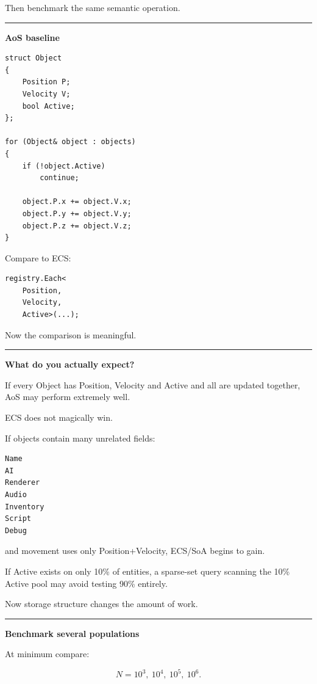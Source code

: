 Then benchmark the same semantic operation.

\begin{center}\rule{0.5\linewidth}{0.5pt}\end{center}

\textbf{AoS baseline}

\begin{verbatim}
struct Object
{
    Position P;
    Velocity V;
    bool Active;
};

for (Object& object : objects)
{
    if (!object.Active)
        continue;

    object.P.x += object.V.x;
    object.P.y += object.V.y;
    object.P.z += object.V.z;
}
\end{verbatim}

Compare to ECS:

\begin{verbatim}
registry.Each<
    Position,
    Velocity,
    Active>(...);
\end{verbatim}

Now the comparison is meaningful.

\begin{center}\rule{0.5\linewidth}{0.5pt}\end{center}

\textbf{What do you actually expect?}

If every Object has Position, Velocity and Active and all are updated together, AoS may perform extremely well.

ECS does not magically win.

If objects contain many unrelated fields:

\begin{verbatim}
Name
AI
Renderer
Audio
Inventory
Script
Debug
\end{verbatim}

and movement uses only Position+Velocity, ECS/SoA begins to gain.

If Active exists on only 10\% of entities, a sparse-set query scanning the 10\% Active pool may avoid testing 90\% entirely.

Now storage structure changes the amount of work.

\begin{center}\rule{0.5\linewidth}{0.5pt}\end{center}

\textbf{Benchmark several populations}

At minimum compare:

\[
N=
10^3,\ 10^4,\ 10^5,\ 10^6.
\]

